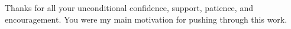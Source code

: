 \documentclass[
11pt, 
oneside,
english,
onehalfspacing,
onehalfspacing,
parskip,
headsepline,
]{MastersDoctoralThesis}
\begin{document}

\begin{dedication}
Thanks for all your unconditional confidence, support, patience, and encouragement. You were my main motivation for pushing through this work.

\end{dedication}

\end{document}
